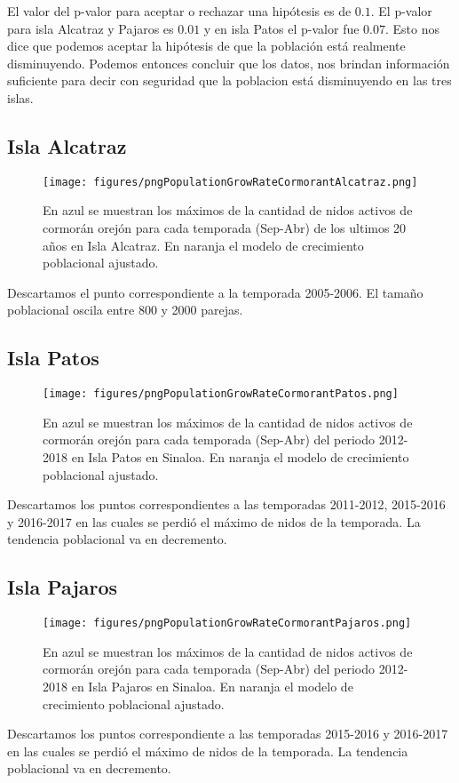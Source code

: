 \documentclass{article} %
\begin{document}
El valor del p-valor para aceptar o rechazar una hipótesis es de $0.1$. El p-valor para isla Alcatraz y Pajaros es $0.01$ y en isla Patos el p-valor fue $0.07$. Esto nos dice que podemos aceptar la hipótesis de que la población está realmente disminuyendo. Podemos entonces concluir que los datos, nos brindan información suficiente para decir con seguridad que la poblacion está disminuyendo en las tres islas.

\subsection*{Isla Alcatraz}

\begin{figure}[H]
\hspace{-2cm}
    \texttt{[image: figures/pngPopulationGrowRateCormorantAlcatraz.png]}
\caption{En azul se muestran los máximos de la cantidad de nidos activos de cormorán orejón para cada temporada (Sep-Abr) de los ultimos 20 años en Isla Alcatraz. En naranja el modelo de crecimiento poblacional ajustado.}
\end{figure}

Descartamos el punto correspondiente a la temporada 2005-2006. El tamaño poblacional oscila entre 800 y 2000 parejas. 

\subsection*{Isla Patos}

\begin{figure}[H]
\hspace{-2cm}
    \texttt{[image: figures/pngPopulationGrowRateCormorantPatos.png]}
\caption{En azul se muestran los máximos de la cantidad de nidos activos de cormorán orejón para cada temporada (Sep-Abr) del periodo 2012-2018 en Isla Patos en Sinaloa. En naranja el modelo de crecimiento poblacional ajustado.}
\end{figure}

Descartamos los puntos correspondientes a las temporadas 2011-2012, 2015-2016 y 2016-2017 en las cuales se perdió el máximo de nidos de la temporada. La tendencia poblacional va en decremento.


\subsection*{Isla Pajaros}

\begin{figure}[H]
\hspace{-2cm}
    \texttt{[image: figures/pngPopulationGrowRateCormorantPajaros.png]}
\caption{En azul se muestran los máximos de la cantidad de nidos activos de cormorán orejón para cada temporada (Sep-Abr) del periodo 2012-2018 en Isla Pajaros en Sinaloa. En naranja el modelo de crecimiento poblacional ajustado.}
\end{figure}


Descartamos los puntos correspondiente a las temporadas 2015-2016 y 2016-2017 en las cuales se perdió el máximo de nidos de la temporada. La tendencia poblacional va en decremento.

 

\end{document}
